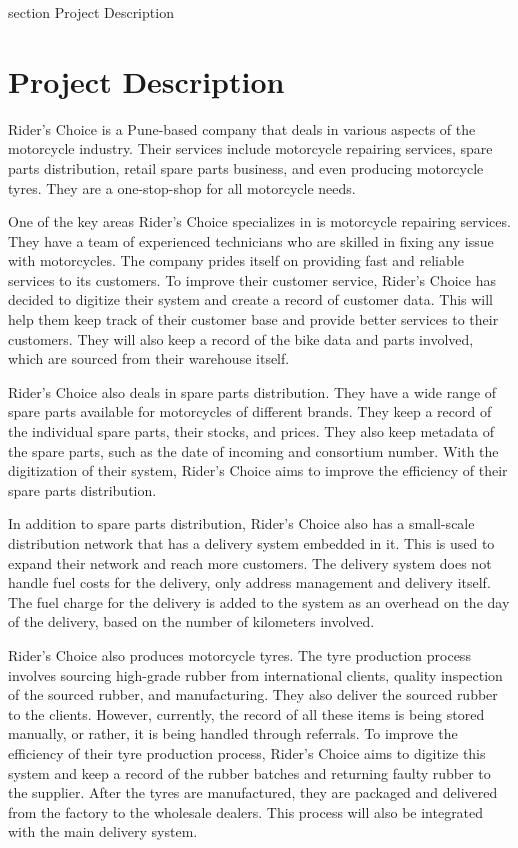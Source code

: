 

 {section} {Project Description}
\section*{Project Description}
\label{Project Description}

Rider's Choice is a Pune-based company that deals in various aspects of the motorcycle industry. Their services include motorcycle repairing services, spare parts distribution, retail spare parts business, and even producing motorcycle tyres. They are a one-stop-shop for all motorcycle needs.

One of the key areas Rider's Choice specializes in is motorcycle repairing services. They have a team of experienced technicians who are skilled in fixing any issue with motorcycles. The company prides itself on providing fast and reliable services to its customers. To improve their customer service, Rider's Choice has decided to digitize their system and create a record of customer data. This will help them keep track of their customer base and provide better services to their customers. They will also keep a record of the bike data and parts involved, which are sourced from their warehouse itself.

Rider's Choice also deals in spare parts distribution. They have a wide range of spare parts available for motorcycles of different brands. They keep a record of the individual spare parts, their stocks, and prices. They also keep metadata of the spare parts, such as the date of incoming and consortium number. With the digitization of their system, Rider's Choice aims to improve the efficiency of their spare parts distribution.

In addition to spare parts distribution, Rider's Choice also has a small-scale distribution network that has a delivery system embedded in it. This is used to expand their network and reach more customers. The delivery system does not handle fuel costs for the delivery, only address management and delivery itself. The fuel charge for the delivery is added to the system as an overhead on the day of the delivery, based on the number of kilometers involved.

Rider's Choice also produces motorcycle tyres. The tyre production process involves sourcing high-grade rubber from international clients, quality inspection of the sourced rubber, and manufacturing. They also deliver the sourced rubber to the clients. However, currently, the record of all these items is being stored manually, or rather, it is being handled through referrals. To improve the efficiency of their tyre production process, Rider's Choice aims to digitize this system and keep a record of the rubber batches and returning faulty rubber to the supplier. After the tyres are manufactured, they are packaged and delivered from the factory to the wholesale dealers. This process will also be integrated with the main delivery system.

